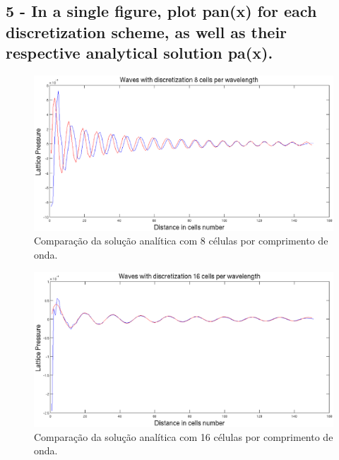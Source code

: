 \subsection{5 - In a single figure, plot pan(x) for each discretization scheme, as well as their respective analytical solution pa(x).} 

\begin{figure}[h!]
    \centering
    \hspace{-2.5cm}
    \includegraphics[width=1.2\textwidth]{figuras/compare_8_cells_discretization.eps}
    \caption{Comparação da solução analítica com 8 células por comprimento de onda.}
\end{figure}

\begin{figure}[h!]
    \centering
    \hspace{-2.5cm}
    \includegraphics[width=1.2\textwidth]{figuras/compare_16_cells_discretization.eps}
    \caption{Comparação da solução analítica com 16 células por comprimento de onda.}
\end{figure}

